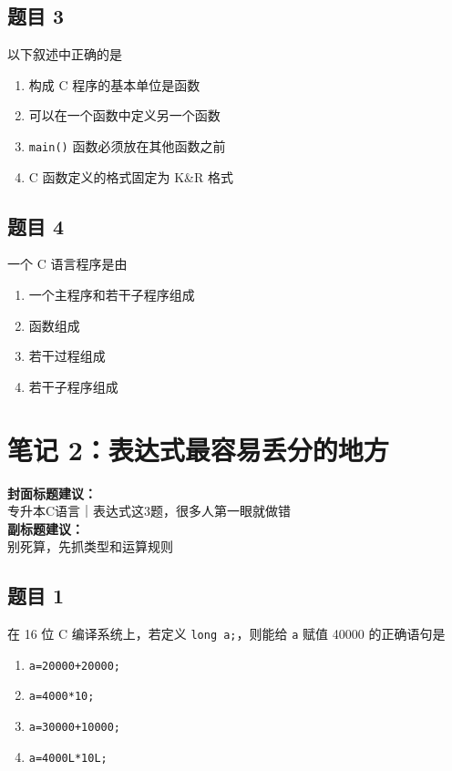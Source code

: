 \documentclass[12pt,a4paper]{ctexart}
\begin{document}
\subsection*{题目 3}
以下叙述中正确的是
\begin{enumerate}[label=\Alph*.]
    \item 构成 C 程序的基本单位是函数
    \item 可以在一个函数中定义另一个函数
    \item \texttt{main()} 函数必须放在其他函数之前
    \item C 函数定义的格式固定为 K\&R 格式
\end{enumerate}

\subsection*{题目 4}
一个 C 语言程序是由
\begin{enumerate}[label=\Alph*.]
    \item 一个主程序和若干子程序组成
    \item 函数组成
    \item 若干过程组成
    \item 若干子程序组成
\end{enumerate}

\newpage

\section{笔记 2：表达式最容易丢分的地方}
\begin{coverbox}
\textbf{封面标题建议：}\\
专升本C语言｜表达式这3题，很多人第一眼就做错\\
\textbf{副标题建议：}\\
别死算，先抓类型和运算规则
\end{coverbox}

\subsection*{题目 1}
在 16 位 C 编译系统上，若定义 \texttt{long a;}，则能给 \texttt{a} 赋值 40000 的正确语句是
\begin{enumerate}[label=\Alph*.]
    \item \texttt{a=20000+20000;}
    \item \texttt{a=4000*10;}
    \item \texttt{a=30000+10000;}
    \item \texttt{a=4000L*10L;}
\end{enumerate}
\end{document}
